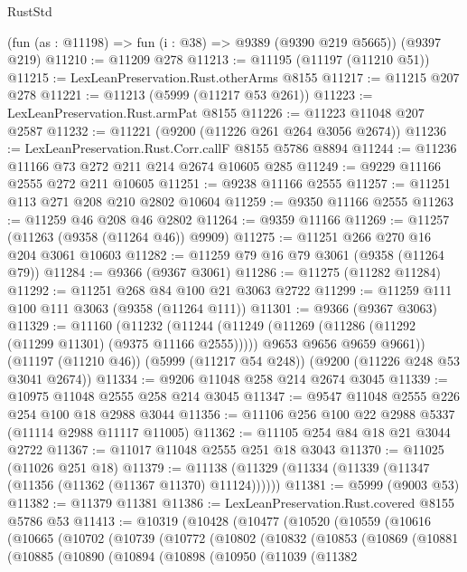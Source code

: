 \begin{lexlean}{RustStd}
\begin{coremodule}
    (fun (as : @11198) => fun (i : @38) => @9389 (@9390 @219 @5665))
    (@9397 @219)
@11210 := @11209 @278
@11213 := @11195 (@11197 (@11210 @51))
@11215 := LexLeanPreservation.Rust.otherArms @8155
@11217 := @11215 @207 @278
@11221 := @11213 (@5999 (@11217 @53 @261))
@11223 := LexLeanPreservation.Rust.armPat @8155
@11226 := @11223 @11048 @207 @2587
@11232 := @11221 (@9200 (@11226 @261 @264 @3056 @2674))
@11236 := LexLeanPreservation.Rust.Corr.callF @8155 @5786 @8894
@11244 := @11236 @11166 @73 @272 @211 @214 @2674 @10605 @285
@11249 := @9229 @11166 @2555 @272 @211 @10605
@11251 := @9238 @11166 @2555
@11257 := @11251 @113 @271 @208 @210 @2802 @10604
@11259 := @9350 @11166 @2555
@11263 := @11259 @46 @208 @46 @2802
@11264 := @9359 @11166
@11269 := @11257 (@11263 (@9358 (@11264 @46)) @9909)
@11275 := @11251 @266 @270 @16 @204 @3061 @10603
@11282 := @11259 @79 @16 @79 @3061 (@9358 (@11264 @79))
@11284 := @9366 (@9367 @3061)
@11286 := @11275 (@11282 @11284)
@11292 := @11251 @268 @84 @100 @21 @3063 @2722
@11299 := @11259 @111 @100 @111 @3063 (@9358 (@11264 @111))
@11301 := @9366 (@9367 @3063)
@11329 := @11160
    (@11232
      (@11244
        (@11249 (@11269 (@11286 (@11292 (@11299 @11301) (@9375 @11166 @2555)))))
        @9653
        @9656
        @9659
        @9661))
    (@11197 (@11210 @46))
    (@5999 (@11217 @54 @248))
    (@9200 (@11226 @248 @53 @3041 @2674))
@11334 := @9206 @11048 @258 @214 @2674 @3045
@11339 := @10975 @11048 @2555 @258 @214 @3045
@11347 := @9547 @11048 @2555 @226 @254 @100 @18 @2988 @3044
@11356 := @11106 @256 @100 @22 @2988 @5337 (@11114 @2988 @11117 @11005)
@11362 := @11105 @254 @84 @18 @21 @3044 @2722
@11367 := @11017 @11048 @2555 @251 @18 @3043
@11370 := @11025 (@11026 @251 @18)
@11379 := @11138 (@11329 (@11334 (@11339 (@11347 (@11356 (@11362 (@11367 @11370) @11124))))))
@11381 := @5999 (@9003 @53)
@11382 := @11379 @11381
@11386 := LexLeanPreservation.Rust.covered @8155 @5786 @53
@11413 := @10319
    (@10428
      (@10477
        (@10520
          (@10559
            (@10616
              (@10665
                (@10702
                  (@10739
                    (@10772
                      (@10802
                        (@10832
                          (@10853
                            (@10869
                              (@10881
                                (@10885
                                  (@10890
                                    (@10894
                                      (@10898
                                        (@10950
                                          (@11039
                                            (@11382

\end{coremodule}
\end{lexlean}

